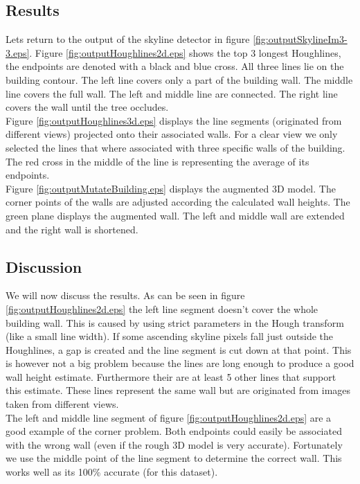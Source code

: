 \documentclass[10pt]{article}
\begin{document}
\subsection{Results}
\noindent
{}
Lets return to the output of the skyline detector in figure \ref{fig:outputSkylineIm3-3.eps}.
Figure \ref{fig:outputHoughlines2d.eps} shows the top 3 longest Houghlines, the
endpoints are denoted with a black and blue cross. All three lines lie on the
building contour.  The left line covers only a part of the building wall. The
middle line covers the full wall. The left and middle line are connected. The
right line covers the wall until the tree occludes.\\

Figure \ref{fig:outputHoughlines3d.eps} displays the line segments (originated from
different views) projected onto their associated walls.  For a clear view we
only selected the lines that where associated with three specific walls of the building.  
The red cross in the middle of the line is representing the average of its endpoints.\\

Figure \ref{fig:outputMutateBuilding.eps} displays the augmented 3D model. The
corner points of the walls are adjusted according the calculated wall heights.
The green plane displays the augmented wall. The left and middle wall are extended
and the right wall is shortened.\\


\subsection{Discussion}
We will now discuss the results. As can be seen in figure \ref{fig:outputHoughlines2d.eps} the left line segment doesn't cover the whole building wall. This is caused by using strict parameters in the Hough transform (like a small line width).
If some ascending skyline pixels fall just outside the Houghlines, a gap is created and the line segment is cut down at that point. This is however not a big problem because the lines are long enough to produce a good wall height estimate. Furthermore their are at least 5 other lines that support this estimate. These lines represent the same wall but are originated from images taken from different views. \\
The left and middle line segment of figure \ref{fig:outputHoughlines2d.eps} are a good example of the corner problem. Both endpoints could easily be associated with the wrong wall (even if the rough 3D model is very accurate). Fortunately we use the middle point of the line segment to determine the correct wall. This works well as its 100\% accurate (for this dataset).
\end{document}

